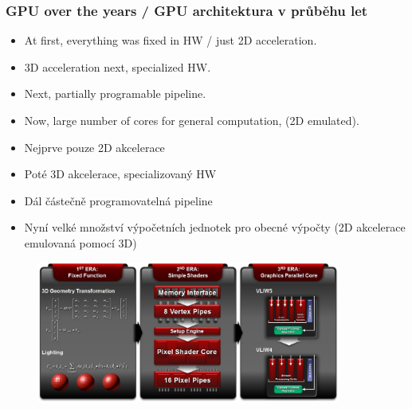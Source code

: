 
\begin{frame}
\frametitle{GPU over the years / GPU architektura v průběhu let}
  \scriptsize
	\begin{itemize}
	\item At first, everything was fixed in HW / just 2D acceleration.
	\item 3D acceleration next, specialized HW.
	\item Next, partially programable pipeline.
  \item Now, large number of cores for general computation, (2D emulated).
	\end{itemize}
	\begin{itemize}
	\item Nejprve pouze 2D akcelerace
	\item Poté 3D akcelerace, specializovaný HW
	\item Dál částečně programovatelná pipeline
	\item Nyní velké množství výpočetních jednotek pro obecné výpočty (2D akcelerace emulovaná pomocí 3D)
	\end{itemize}
	\begin{figure}[h]
	\includegraphics[width=10cm,keepaspectratio]{pics/gpu/gpu_amdevoluce}
	\end{figure}
\end{frame}

